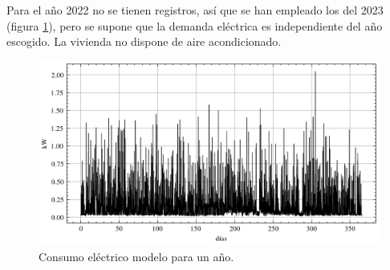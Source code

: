 Para el año 2022 no se tienen registros, así que se han empleado los del 2023
(figura \ref{fig:p_demand_year}), pero se supone que la demanda eléctrica es
independiente del año escogido. La vivienda no dispone de aire acondicionado.

\begin{figure}[h] \centering
	\centering
	\includegraphics[width=1\textwidth]{./capitulos/adquisicion_de_datos/images/p_demand_year.png}
	\caption{Consumo eléctrico modelo para un año.}
	\label{fig:p_demand_year}
\end{figure}
